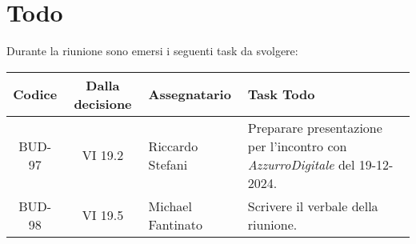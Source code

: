 
\section{Todo}

Durante la riunione sono emersi i seguenti task da svolgere:

\vspace{0.5cm}

\begin{table}[htbp]
\centering
{}
\begin{tabular}{|c|c|p{}|p{}|}
    \hline
    \rowcolor[gray]{0.75}
    \textbf{Codice} & \textbf{Dalla decisione} & \textbf{Assegnatario} & \textbf{Task Todo} \\
    \hline
    BUD-97 & VI 19.2 & Riccardo Stefani & Preparare presentazione per l'incontro con \emph{AzzurroDigitale} del 19-12-2024. \\
    \hline
    BUD-98 & VI 19.5 & Michael Fantinato & Scrivere il verbale della riunione. \\
    \hline
\end{tabular}
\end{table}